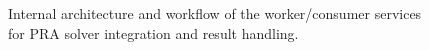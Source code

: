 \begin{figure}[]
  \centering
  
  \caption{Internal architecture and workflow of the worker/consumer services for PRA solver integration and result handling.}
  \label{fig:solver-integration}
\end{figure}
